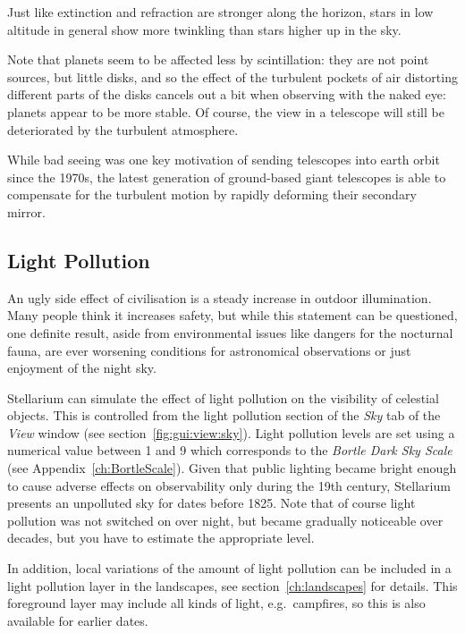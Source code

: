 Just like extinction and refraction are stronger along the horizon, 
stars in low altitude in general show more twinkling than stars higher up in the sky. 

Note that planets seem to be affected less by scintillation: they are not point sources, but little disks, 
and so the effect of the turbulent pockets of air distorting different parts of the disks cancels out a bit 
when observing with the naked eye: planets appear to be more stable.
Of course, the view in a telescope will still be deteriorated by the turbulent atmosphere.

While bad seeing was one key motivation of sending telescopes into earth orbit since the 1970s, 
the latest generation of ground-based giant telescopes is able to compensate for the turbulent 
motion by rapidly deforming their secondary mirror. 



\subsection{Light Pollution}
\label{sec:phenomena:LightPollution}

An ugly side effect of civilisation is a steady increase in outdoor
illumination. Many people think it increases safety, but while this
statement can be questioned, one definite result, aside from
environmental issues like dangers for the nocturnal fauna, are ever
worsening conditions for astronomical observations or just enjoyment
of the night sky. 

Stellarium can simulate the effect of light pollution on the visibility 
of celestial objects. This is controlled from the
light pollution section of the \emph{Sky} tab of the \emph{View}
window (see section~\ref{fig:gui:view:sky}).  Light pollution levels are set using a numerical value
between 1 and 9 which corresponds to the \emph{Bortle Dark Sky Scale}
(see Appendix~\ref{ch:BortleScale}). Given that public lighting became 
bright enough to cause adverse effects on observability only during 
the 19th century, Stellarium presents an unpolluted sky for dates before 1825. 
Note that of course light pollution was not switched on over night, 
but became gradually noticeable over decades, but you have to estimate the appropriate level. 

In addition, local variations of
the amount of light pollution can be included in a light pollution
layer in the landscapes, see
section~\ref{ch:landscapes} for details. This foreground layer may include 
all kinds of light, e.g.\  campfires, so this is also available for earlier 
dates.


